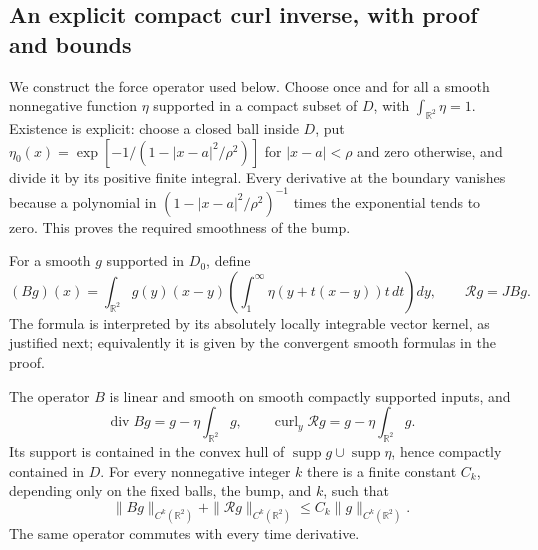 \subsection{An explicit compact curl inverse, with proof and bounds}

We construct the force operator used below.  Choose once and for all a
smooth nonnegative function \(\eta\) supported in a compact subset of
\(D\), with \(\int_{\mathbb R^2}\eta=1\).  Existence is explicit:
choose a closed ball inside \(D\), put
\(\eta_0(x)=\exp[-1/(1-|x-a|^2/\rho^2)]\) for \(|x-a|<\rho\)
and zero otherwise, and divide it by its positive finite integral.
Every derivative at the boundary vanishes because a polynomial in
\((1-|x-a|^2/\rho^2)^{-1}\) times the exponential tends to zero.
This proves the required smoothness of the bump.

For a smooth \(g\) supported in \(D_0\), define
\begin{equation}
 (Bg)(x)=\int_{\mathbb R^2}g(y)(x-y)
       \left(\int_1^\infty\eta(y+t(x-y))t\,dt\right)dy,
 \qquad \mathcal Rg=JBg.
 \label{eq:ec-B}
\end{equation}
The formula is interpreted by its absolutely locally integrable vector
kernel, as justified next; equivalently it is given by the convergent
smooth formulas in the proof.

\begin{lemma}
\label{lem:ec-inverse-div}
The operator \(B\) is linear and smooth on smooth compactly supported
inputs, and
\begin{equation}
 \operatorname{div}Bg=g-\eta\int_{\mathbb R^2}g,
 \qquad
 \operatorname{curl}_y\mathcal Rg=g-\eta\int_{\mathbb R^2}g.
 \label{eq:ec-B-div}
\end{equation}
Its support is contained in the convex hull of
\(\operatorname{supp}g\cup\operatorname{supp}\eta\), hence compactly
contained in \(D\).  For every nonnegative integer \(k\) there is a
finite constant \(C_k\), depending only on the fixed balls, the bump,
and \(k\), such that
\begin{equation}
 \|Bg\|_{C^k(\mathbb R^2)}+
 \|\mathcal Rg\|_{C^k(\mathbb R^2)}\leq C_k\|g\|_{C^k(\mathbb R^2)}.
 \label{eq:ec-B-bound}
\end{equation}
The same operator commutes with every time derivative.
\end{lemma}

